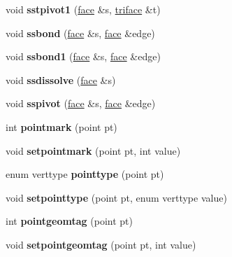 \begin{DoxyCompactItemize}
void {\bfseries sstpivot1} (\hyperlink{classtetgenmesh_1_1face}{face} \&s, \hyperlink{classtetgenmesh_1_1triface}{triface} \&t)
\item 
\mbox{\label{classtetgenmesh_a3455f1e360143408fa4436b4abdf0829}} 
void {\bfseries ssbond} (\hyperlink{classtetgenmesh_1_1face}{face} \&s, \hyperlink{classtetgenmesh_1_1face}{face} \&edge)
\item 
\mbox{\label{classtetgenmesh_a06465e672c37dc4131bb53c15b8f4ffe}} 
void {\bfseries ssbond1} (\hyperlink{classtetgenmesh_1_1face}{face} \&s, \hyperlink{classtetgenmesh_1_1face}{face} \&edge)
\item 
\mbox{\label{classtetgenmesh_a66ffac4c97815467190daa5d52fc69ef}} 
void {\bfseries ssdissolve} (\hyperlink{classtetgenmesh_1_1face}{face} \&s)
\item 
\mbox{\label{classtetgenmesh_a0c20f7727f97d5d31f9d853d85267a21}} 
void {\bfseries sspivot} (\hyperlink{classtetgenmesh_1_1face}{face} \&s, \hyperlink{classtetgenmesh_1_1face}{face} \&edge)
\item 
\mbox{\label{classtetgenmesh_a46fa5fabd0e8e806f7f8beb069732e21}} 
int {\bfseries pointmark} (point pt)
\item 
\mbox{\label{classtetgenmesh_ad2cce627693ef75e8fc956b0e0743800}} 
void {\bfseries setpointmark} (point pt, int value)
\item 
\mbox{\label{classtetgenmesh_a87204594ee11bb38e68e0381e6e04b6c}} 
enum verttype {\bfseries pointtype} (point pt)
\item 
\mbox{\label{classtetgenmesh_a036752e66b8fcce81d7f983842fcf8d3}} 
void {\bfseries setpointtype} (point pt, enum verttype value)
\item 
\mbox{\label{classtetgenmesh_a5f3d4b9b05181247bc518d6c0b0ac790}} 
int {\bfseries pointgeomtag} (point pt)
\item 
\mbox{\label{classtetgenmesh_ae61f5def2617ad2cedf2bbc5f6a59c02}} 
void {\bfseries setpointgeomtag} (point pt, int value)

\end{DoxyCompactItemize}
